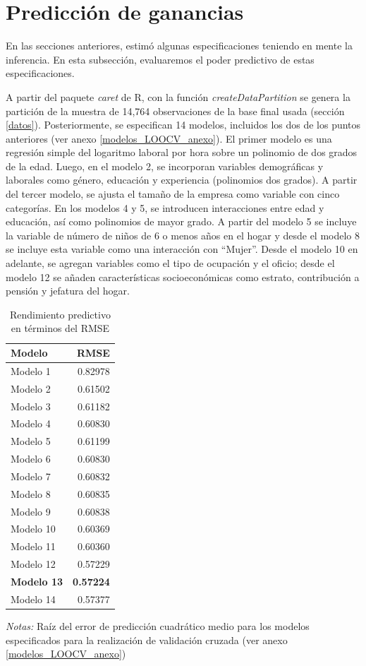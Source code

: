 \documentclass[12pt,a4paper,onecolumn]{article}
\begin{document}
\section{Predicción de ganancias}
En las secciones anteriores, estimó algunas especificaciones teniendo en mente la inferencia. En esta subsección, evaluaremos el poder predictivo de estas especificaciones.

A partir del paquete \textit{caret} de R, con la función \textit{createDataPartition} se genera la partición de la muestra de 14,764 observaciones de la base final usada (sección \ref{datos}). Posteriormente,  se especifican 14 modelos, incluidos los dos de los puntos anteriores (ver anexo \ref{modelos_LOOCV_anexo}). El primer modelo es una regresión simple del logaritmo laboral por hora sobre un polinomio de dos grados de la  edad. Luego, en el modelo 2, se incorporan variables demográficas y laborales como género, educación y experiencia (polinomios dos grados). A partir del tercer modelo, se ajusta el tamaño de la empresa como variable con cinco categorías. En los modelos 4 y 5, se introducen interacciones entre edad y educación, así como polinomios de mayor grado. A partir del modelo 5 se incluye la variable de número de niños de 6 o menos años en el hogar y desde el modelo 8 se incluye esta variable como una interacción con ``Mujer''. Desde el modelo 10 en adelante, se agregan variables como el tipo de ocupación y el oficio; desde el modelo 12 se añaden características socioeconómicas como estrato, contribución a pensión y jefatura del hogar.

\begin{table}[ht]
\centering
\caption{Rendimiento predictivo en términos del RMSE}\label{RMSE_CV}
\begin{tabular}{lr}
  \hline
Modelo & RMSE \\ 
  \hline
Modelo 1 & 0.82978 \\ 
  Modelo 2 & 0.61502 \\ 
  Modelo 3 & 0.61182 \\ 
  Modelo 4 & 0.60830 \\ 
  Modelo 5 & 0.61199 \\ 
  Modelo 6 & 0.60830 \\ 
  Modelo 7 & 0.60832 \\ 
  Modelo 8 & 0.60835 \\ 
  Modelo 9 & 0.60838 \\ 
  Modelo 10 & 0.60369 \\ 
  Modelo 11 & 0.60360 \\ 
  Modelo 12 & 0.57229 \\ 
  {\color{teal}\textbf{Modelo 13}} & {\color{teal} \textbf{0.57224}}  \\ 
  Modelo 14 & 0.57377 \\ 
   \hline
\end{tabular}
   \begin{minipage}{0.8\textwidth}  
     \footnotesize \scriptsize { \textit{Notas:} Raíz del error de predicción cuadrático medio para los modelos especificados para la realización de validación cruzada (ver anexo \ref{modelos_LOOCV_anexo})}
    \end{minipage}
\end{table}
\end{document}
